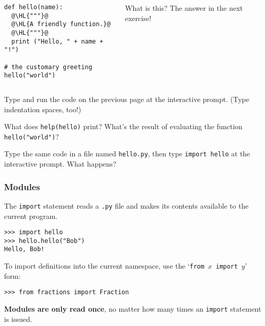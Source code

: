 \documentclass[english,serif,mathserif,xcolor=pdftex,dvipsnames,table]{beamer}
\begin{document}
\begin{frame}[fragile]
  \begin{columns}[t]
    \begin{column}{0.5\textwidth}
\begin{lstlisting}
def hello(name):
  @\HL{"""}@
  @\HL{A friendly function.}@
  @\HL{"""}@
  print ("Hello, " + name + "!")

# the customary greeting
hello("world")
\end{lstlisting}
    \end{column}
    \begin{column}{0.5\textwidth}
      \raggedleft 
      What is this? The answer in the next exercise!
    \end{column}
  \end{columns}
\end{frame}

\begin{frame}
  \begin{exercise}
    Type and run the code on the previous page at the interactive
    prompt. (Type indentation spaces, too!)
    
    What does \texttt{help(hello)} print?  
    What's the result of evaluating the function \texttt{hello("world")}?
  \end{exercise}

  \+
  \begin{exercise}
    Type the same code in a file named \texttt{hello.py}, then type
    \texttt{import hello} at the interactive prompt.
    What happens?
  \end{exercise}  
\end{frame}


\begin{frame}[fragile]
  \frametitle{Modules}
  The \texttt{import} statement reads a \texttt{.py} file and makes
  its contents available to the current program.
\begin{lstlisting}
>>> import hello
>>> hello.hello("Bob")
Hello, Bob!
\end{lstlisting}

  \+
  To import definitions into the current namespace, use the
  `\texttt{from $x$ import $y$}' form:
\begin{lstlisting}
>>> from fractions import Fraction
\end{lstlisting}

  \+
  \textbf{Modules are only read once}, no matter how many times an
  \texttt{import} statement is issued.
\end{frame}
\end{document}
